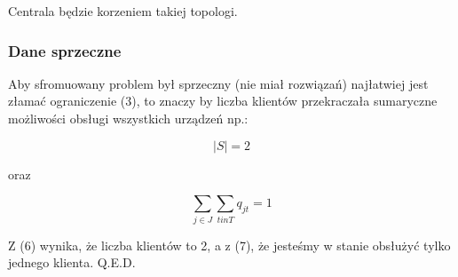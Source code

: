 \documentclass{article}
\begin{document}
Centrala będzie korzeniem takiej topologi.

\subsubsection{Dane sprzeczne}

Aby sfromuowany problem był sprzeczny (nie miał rozwiązań) najłatwiej jest złamać ograniczenie (3),
to znaczy by liczba klientów przekraczała sumaryczne możliwości obsługi wszystkich urządzeń np.:

\begin{equation}
  |S| = 2
\end{equation}

oraz

\begin{equation}
  \sum_{j \in J} \sum_{t in T} q_{jt} = 1
\end{equation}

Z (6) wynika, że liczba klientów to 2, a z (7), że jesteśmy w stanie obsłużyć tylko jednego klienta. Q.E.D.
\end{document}
